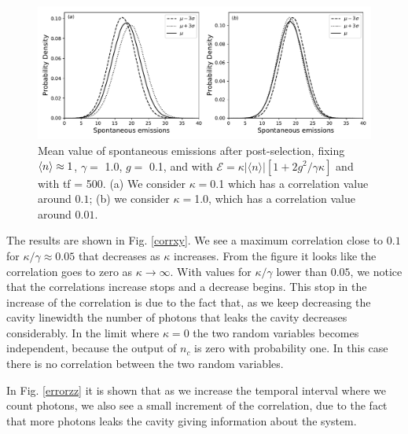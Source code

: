 \documentclass[%
 reprint,
 amsmath,amssymb,
 aps, 
]{revtex4-2}
\begin{document}
\begin{center}
\begin{figure}[!t]\label{error2}
\begin{center}
\includegraphics[scale = 0.7]{lastgraph.pdf}
\caption{\small{Mean value of spontaneous emissions after post-selection, fixing $\expval{n} \approx 1$, $\gamma =$ 1.0, $g = $ 0.1, and with  $\mathcal{E} =  \kappa |\langle n \rangle|[1 + 2g^2/\gamma \kappa]$ and with tf = 500. (a) We consider $\kappa = $0.1 which has a correlation value around $0.1$; (b) we consider $\kappa = $1.0, which has a correlation value around $0.01$.}} \label{probdisult}
\end{center}
\end{figure}
\end{center}
The results are shown in Fig. \ref{corrxy}. We see a maximum
correlation close to $0.1$ for $\kappa/\gamma\approx 0.05$ that
decreases as $\kappa$ increases. From the figure it looks like the
correlation goes to zero as $\kappa\rightarrow\infty$. With values for
$\kappa/\gamma$ lower than $0.05$, we notice that the correlations
increase stops and a decrease begins. This stop in the increase of the
correlation is due to the fact that, as we keep decreasing the cavity
linewidth the number of photons that leaks the cavity decreases
considerably. In the limit where $\kappa=0$ the two random
variables becomes independent, because the output of $n_c$ is zero
with probability one. In this case there is no correlation between the two
random variables.





In Fig. \ref{errorzz} it is shown that as we increase the temporal
interval where we count photons, we also see a small increment of the
correlation, due to the fact that more photons leaks the cavity
giving information about the system.

\end{document}
